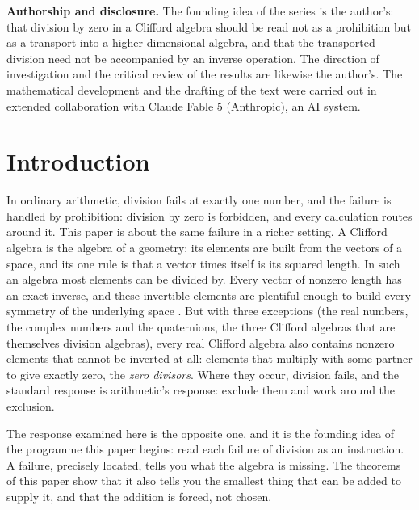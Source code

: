 \newpage
\textbf{Authorship and disclosure. }The founding idea of the series is the author's: that division by zero in a Clifford algebra should be read not as a prohibition but as a transport into a higher-dimensional algebra, and that the transported division need not be accompanied by an inverse operation. The direction of investigation and the critical review of the results are likewise the author's. The mathematical development and the drafting of the text were carried out in extended collaboration with Claude Fable 5 (Anthropic), an AI system.

\newpage
\section{Introduction}\label{sec:intro}

In ordinary arithmetic, division fails at exactly one number, and the failure is handled by prohibition: division by zero is forbidden, and every calculation routes around it. This paper is about the same failure in a richer setting. A Clifford algebra is the algebra of a geometry: its elements are built from the vectors of a space, and its one rule is that a vector times itself is its squared length. In such an algebra most elements can be divided by. Every vector of nonzero length has an exact inverse, and these invertible elements are plentiful enough to build every symmetry of the underlying space \cite{HestenesSobczyk1984, DoranLasenby2003}. But with three exceptions (the real numbers, the complex numbers and the quaternions, the three Clifford algebras that are themselves division algebras), every real Clifford algebra also contains nonzero elements that cannot be inverted at all: elements that multiply with some partner to give exactly zero, the \emph{zero divisors}. Where they occur, division fails, and the standard response is arithmetic's response: exclude them and work around the exclusion.

The response examined here is the opposite one, and it is the founding idea of the programme this paper begins: read each failure of division as an instruction. A failure, precisely located, tells you what the algebra is missing. The theorems of this paper show that it also tells you the smallest thing that can be added to supply it, and that the addition is forced, not chosen.

